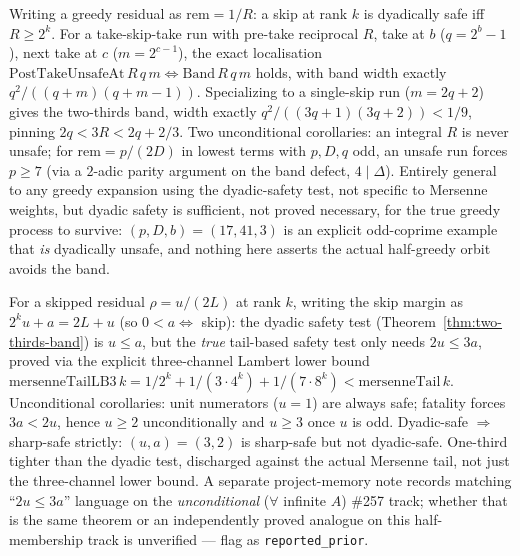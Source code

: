 \begin{thm}
\label{thm:two-thirds-band}
Writing a greedy residual as $\mathrm{rem}=1/R$: a skip at rank $k$ is dyadically safe
iff $R\ge 2^k$. For a take-skip-take run with pre-take reciprocal $R$, take at $b$
($q=2^b-1$), next take at $c$ ($m=2^{c-1}$), the exact localisation
$\mathrm{PostTakeUnsafeAt}\,R\,q\,m \iff \mathrm{Band}\,R\,q\,m$ holds, with band width
exactly $q^2/((q{+}m)(q{+}m{-}1))$. Specializing to a single-skip run ($m=2q{+}2$) gives
the two-thirds band, width exactly $q^2/((3q{+}1)(3q{+}2))<1/9$, pinning $2q<3R<2q+2/3$.
Two unconditional corollaries: an integral $R$ is never unsafe; for $\mathrm{rem}=p/(2D)$
in lowest terms with $p,D,q$ odd, an unsafe run forces $p\ge 7$ (via a $2$-adic parity
argument on the band defect, $4\mid\Delta$). Entirely general to any greedy expansion
using the dyadic-safety test, not specific to Mersenne weights, but dyadic safety is
sufficient, not proved necessary, for the true greedy process to survive: $(p,D,b)=
(17,41,3)$ is an explicit odd-coprime example that \emph{is} dyadically unsafe, and
nothing here asserts the actual half-greedy orbit avoids the band.
\par{}
\end{thm}

\begin{thm}
\label{thm:sharp-fatal-gap}
For a skipped residual $\rho=u/(2L)$ at rank $k$, writing the skip margin as
$2^k u+a=2L+u$ (so $0<a\Leftrightarrow$ skip): the dyadic safety test
(Theorem~\ref{thm:two-thirds-band}) is $u\le a$, but the \emph{true} tail-based safety
test only needs $2u\le 3a$, proved via the explicit three-channel Lambert lower bound
$\mathrm{mersenneTailLB3}\,k = 1/2^k+1/(3\cdot 4^k)+1/(7\cdot 8^k) <
\mathrm{mersenneTail}\,k$. Unconditional corollaries: unit numerators ($u=1$) are always
safe; fatality forces $3a<2u$, hence $u\ge 2$ unconditionally and $u\ge 3$ once $u$ is
odd. Dyadic-safe $\Rightarrow$ sharp-safe strictly: $(u,a)=(3,2)$ is sharp-safe but not
dyadic-safe. One-third tighter than the dyadic test, discharged against the actual
Mersenne tail, not just the three-channel lower bound. A separate project-memory note
records matching ``$2u\le 3a$'' language on the \emph{unconditional} ($\forall$ infinite
$A$) \#257 track; whether that is the same theorem or an independently proved analogue on
this half-membership track is unverified — flag as \texttt{reported\_prior}.
\par{}
\end{thm}

